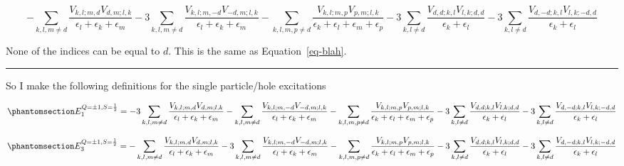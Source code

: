 \documentclass[
  letterpaper,
  DIV=11,
  numbers=noendperiod]{scrartcl}
\begin{document}
\begin{tcolorbox}[enhanced jigsaw, arc=.35mm, bottomrule=.15mm, bottomtitle=1mm, breakable, colback=white, colbacktitle=quarto-callout-note-color!10!white, colframe=quarto-callout-note-color-frame, coltitle=black, left=2mm, leftrule=.75mm, opacityback=0, opacitybacktitle=0.6, rightrule=.15mm, title=\textcolor{quarto-callout-note-color}{\faInfo}\hspace{0.5em}{Single particle
\(a^\dagger_{d,\uparrow}b^\dagger_{-d,\uparrow}b^\dagger_{-d,\downarrow}|\Omega\rangle\)
2nd-order shift}, titlerule=0mm, toprule=.15mm, toptitle=1mm]

\begin{equation}
\boxed{
-\sum_{k,l,m\ne d}\frac{V_{k,l;m,d}V_{d,m;l,k}}{\epsilon_{l}+\epsilon_{k}+\epsilon_m}
-3\sum_{k,l,m\ne d}\frac{V_{k,l;m,-d}V_{-d,m;l,k}}{\epsilon_{l}+\epsilon_{k}+\epsilon_m}
-\sum_{k,l,m,p\ne d}\frac{V_{k,l;m,p}V_{p,m;l,k}}{\epsilon_{k}+\epsilon_{l}+\epsilon_m+\epsilon_p}
-3\sum_{k,l\ne d}\frac{V_{d,d;k,l}V_{l,k;d,d}}{\epsilon_{k}+\epsilon_{l}}
-3\sum_{k,l\ne d}\frac{V_{d,-d;k,l}V_{l,k;-d,d}}{\epsilon_{k}+\epsilon_{l}}
}
\end{equation}

None of the indices can be equal to \(d\). This is the same as
Equation~\ref{eq-blah}\footnotemark{}.

\end{tcolorbox}


\begin{center}\rule{0.5\linewidth}{0.5pt}\end{center}

So I make the following definitions for the single particle/hole
excitations

\begin{equation}\protect\phantomsection\label{eq-EQ1plus}{
E^{Q=\pm 1,S=\frac{1}{2}}_{1}=-3\sum_{k,l,m\ne d}\frac{V_{k,l;m,d}V_{d,m;l,k}}{\epsilon_{l}+\epsilon_{k}+\epsilon_m}
-\sum_{k,l,m\ne d}\frac{V_{k,l;m,-d}V_{-d,m;l,k}}{\epsilon_{l}+\epsilon_{k}+\epsilon_m}
-\sum_{k,l,m,p\ne d}\frac{V_{k,l;m,p}V_{p,m;l,k}}{\epsilon_{k}+\epsilon_{l}+\epsilon_m+\epsilon_p}
-3\sum_{k,l\ne d}\frac{V_{d,d;k,l}V_{l,k;d,d}}{\epsilon_{k}+\epsilon_{l}}
-3\sum_{k,l\ne d}\frac{V_{d,-d;k,l}V_{l,k;-d,d}}{\epsilon_{k}+\epsilon_{l}}
}\end{equation}

\begin{equation}\protect\phantomsection\label{eq-EQ1minus}{
E^{Q=\pm 1,S=\frac{1}{2}}_{3}=-\sum_{k,l,m\ne d}\frac{V_{k,l;m,d}V_{d,m;l,k}}{\epsilon_{l}+\epsilon_{k}+\epsilon_m}
-3\sum_{k,l,m\ne d}\frac{V_{k,l;m,-d}V_{-d,m;l,k}}{\epsilon_{l}+\epsilon_{k}+\epsilon_m}
-\sum_{k,l,m,p\ne d}\frac{V_{k,l;m,p}V_{p,m;l,k}}{\epsilon_{k}+\epsilon_{l}+\epsilon_m+\epsilon_p}
-3\sum_{k,l\ne d}\frac{V_{d,d;k,l}V_{l,k;d,d}}{\epsilon_{k}+\epsilon_{l}}
-3\sum_{k,l\ne d}\frac{V_{d,-d;k,l}V_{l,k;-d,d}}{\epsilon_{k}+\epsilon_{l}}
}\end{equation}
\end{document}
